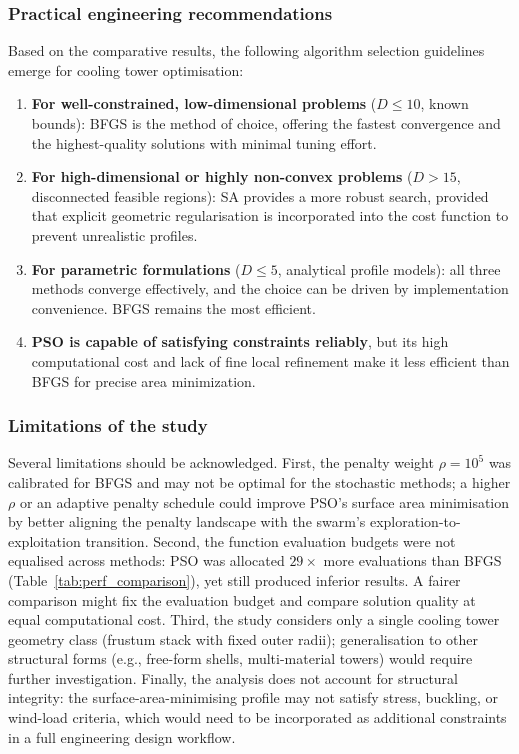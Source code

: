 \subsubsection{Practical engineering recommendations}

Based on the comparative results, the following algorithm selection guidelines emerge for cooling tower optimisation:

\begin{enumerate}
    \item \textbf{For well-constrained, low-dimensional problems} ($D \leq 10$, known bounds): BFGS is the method of choice, offering the fastest convergence and the highest-quality solutions with minimal tuning effort.
    
    \item \textbf{For high-dimensional or highly non-convex problems} ($D > 15$, disconnected feasible regions): SA provides a more robust search, provided that explicit geometric regularisation is incorporated into the cost function to prevent unrealistic profiles.
    
    \item \textbf{For parametric formulations} ($D \leq 5$, analytical profile models): all three methods converge effectively, and the choice can be driven by implementation convenience. BFGS remains the most efficient.
    
    \item \textbf{PSO is capable of satisfying constraints reliably}, but its high computational cost and lack of fine local refinement make it less efficient than BFGS for precise area minimization.
\end{enumerate}

\subsubsection{Limitations of the study}

Several limitations should be acknowledged. First, the penalty weight $\rho = 10^5$ was calibrated for BFGS and may not be optimal for the stochastic methods; a higher $\rho$ or an adaptive penalty schedule could improve PSO's surface area minimisation by better aligning the penalty landscape with the swarm's exploration-to-exploitation transition. Second, the function evaluation budgets were not equalised across methods: PSO was allocated $29\times$ more evaluations than BFGS (Table~\ref{tab:perf_comparison}), yet still produced inferior results. A fairer comparison might fix the evaluation budget and compare solution quality at equal computational cost. Third, the study considers only a single cooling tower geometry class (frustum stack with fixed outer radii); generalisation to other structural forms (e.g., free-form shells, multi-material towers) would require further investigation. Finally, the analysis does not account for structural integrity: the surface-area-minimising profile may not satisfy stress, buckling, or wind-load criteria, which would need to be incorporated as additional constraints in a full engineering design workflow.
